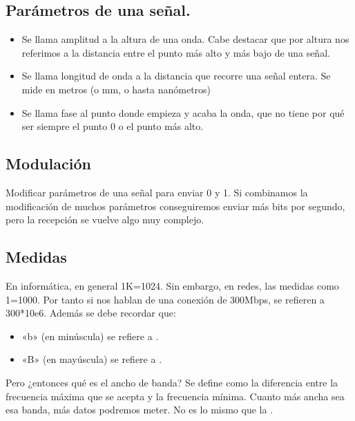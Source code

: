 \documentclass[letterpaper,10pt,spanish]{sphinxmanual}
\begin{document}
\subsection{Parámetros de una señal.}
\label{\detokenize{t2_integracion_elementos/apuntes_t2:parametros-de-una-senal}}\begin{itemize}
\item {} 
Se llama amplitud a la altura de una onda. Cabe destacar que por altura nos referimos a la distancia entre el punto más alto y más bajo de una señal.

\item {} 
Se llama longitud de onda a la distancia que recorre una señal entera. Se mide en metros (o mm, o hasta nanómetros)

\item {} 
Se llama fase al punto donde empieza y acaba la onda, que no tiene por qué ser siempre el punto 0 o el punto más alto.

\end{itemize}


\subsection{Modulación}
\label{\detokenize{t2_integracion_elementos/apuntes_t2:modulacion}}
Modificar parámetros de una señal para enviar 0 y 1. Si combinamos la modificación de muchos parámetros conseguiremos enviar más bits por segundo, pero la recepción se vuelve algo muy complejo.


\subsection{Medidas}
\label{\detokenize{t2_integracion_elementos/apuntes_t2:medidas}}
En informática, en general 1K=1024. Sin embargo, en redes, las medidas como 1=1000. Por tanto si nos hablan de una conexión de 300Mbps, se refieren a 300*10e6. Además se debe recordar que:
\begin{itemize}
\item {} 
«b» (en minúscula) se refiere a .

\item {} 
«B» (en mayúscula) se refiere a .

\end{itemize}

Pero ¿entonces qué es el ancho de banda? Se define como la diferencia entre la frecuencia máxima que se acepta y la frecuencia mínima. Cuanto más ancha sea esa banda, más datos podremos meter. No es lo mismo que la .
\end{document}
